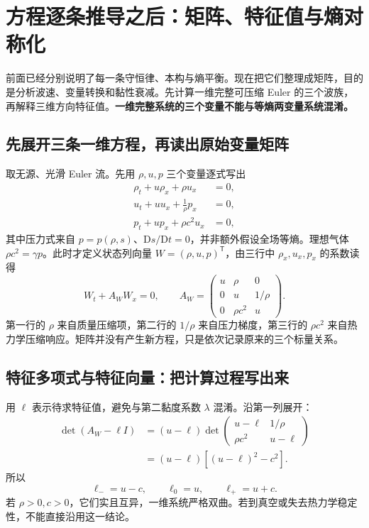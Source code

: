 \section{方程逐条推导之后：矩阵、特征值与熵对称化}\label{sec:full-characteristics}

前面已经分别说明了每一条守恒律、本构与熵平衡。现在把它们整理成矩阵，目的是分析波速、变量转换和黏性衰减。先计算一维完整可压缩 Euler 的三个波族，再解释三维方向特征值。\textbf{一维完整系统的三个变量不能与等熵两变量系统混淆。}

\subsection{先展开三条一维方程，再读出原始变量矩阵}

取无源、光滑 Euler 流。先用 $\rho,u,p$ 三个变量逐式写出
\begin{align}
 \rho_t+u\rho_x+\rho u_x&=0,\label{eq:primitive-rho-characteristic}\\
 u_t+u u_x+\frac1\rho p_x&=0,\label{eq:primitive-u-characteristic}\\
 p_t+u p_x+\rho c^2u_x&=0,\label{eq:primitive-p-characteristic}
\end{align}
其中压力式来自 $p=p(\rho,s)$、$\mathrm Ds/\mathrm Dt=0$，并非额外假设全场等熵。理想气体 $\rho c^2=\gamma p$。此时才定义状态列向量 $W=(\rho,u,p)^{\mathsf T}$，由三行中 $\rho_x,u_x,p_x$ 的系数读得
\begin{equation}
 W_t+A_WW_x=0,\qquad
 A_W=\begin{pmatrix}
 u&\rho&0\\0&u&1/\rho\\0&\rho c^2&u
 \end{pmatrix}.\label{eq:primitive-euler-matrix}
\end{equation}
第一行的 $\rho$ 来自质量压缩项，第二行的 $1/\rho$ 来自压力梯度，第三行的 $\rho c^2$ 来自热力学压缩响应。矩阵并没有产生新方程，只是依次记录原来的三个标量关系。

\subsection{特征多项式与特征向量：把计算过程写出来}

用 $\ell$ 表示待求特征值，避免与第二黏度系数 $\lambda$ 混淆。沿第一列展开：
\begin{align}
 \det(A_W-\ell I)
 &=(u-\ell)\det\begin{pmatrix}u-\ell&1/\rho\\\rho c^2&u-\ell\end{pmatrix}\\
 &=(u-\ell)[(u-\ell)^2-c^2].
\end{align}
所以
\begin{equation}
 \boxed{\ell_-=u-c,\qquad\ell_0=u,\qquad\ell_+=u+c.}
 \label{eq:full-euler-eigenvalues}
\end{equation}
若 $\rho>0,c>0$，它们实且互异，一维系统严格双曲。若到真空或失去热力学稳定性，不能直接沿用这一结论。

